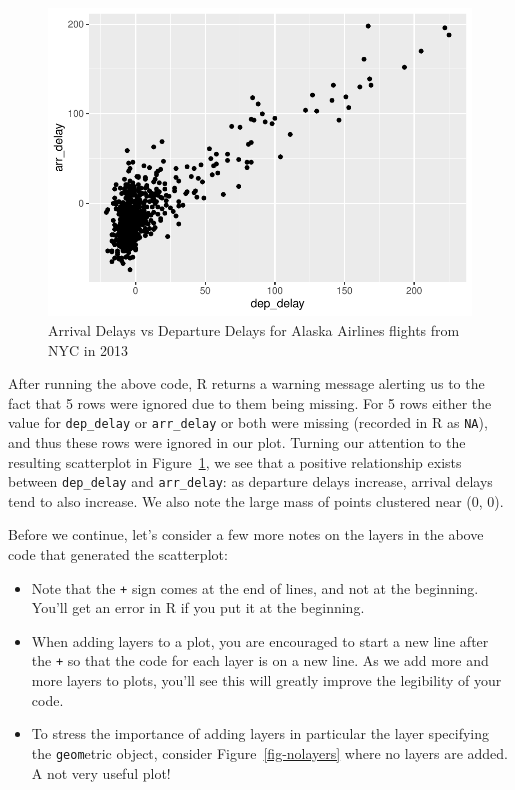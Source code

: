\documentclass[
  letterpaper,
  DIV=11,
  numbers=noendperiod]{scrreprt}
\providecommand{\tightlist}{%
  \setlength{\itemsep}{0pt}\setlength{\parskip}{0pt}}\usepackage{longtable,booktabs,array}
\theoremstyle{definition}
\theoremstyle{remark}
\begin{document}
\begin{figure}

{\centering \includegraphics{02-visualization_files/figure-pdf/fig-noalpha-1.pdf}

}

\caption{\label{fig-noalpha}Arrival Delays vs Departure Delays for
Alaska Airlines flights from NYC in 2013}

\end{figure}

After running the above code, R returns a warning message alerting us to
the fact that 5 rows were ignored due to them being missing. For 5 rows
either the value for \texttt{dep\_delay} or \texttt{arr\_delay} or both
were missing (recorded in R as \texttt{NA}), and thus these rows were
ignored in our plot. Turning our attention to the resulting scatterplot
in Figure~\ref{fig-noalpha}, we see that a positive relationship exists
between \texttt{dep\_delay} and \texttt{arr\_delay}: as departure delays
increase, arrival delays tend to also increase. We also note the large
mass of points clustered near (0, 0).

Before we continue, let's consider a few more notes on the layers in the
above code that generated the scatterplot:

\begin{itemize}
\tightlist
\item
  Note that the \texttt{+} sign comes at the end of lines, and not at
  the beginning. You'll get an error in R if you put it at the
  beginning.
\item
  When adding layers to a plot, you are encouraged to start a new line
  after the \texttt{+} so that the code for each layer is on a new line.
  As we add more and more layers to plots, you'll see this will greatly
  improve the legibility of your code.
\item
  To stress the importance of adding layers in particular the layer
  specifying the \texttt{geom}etric object, consider
  Figure~\ref{fig-nolayers} where no layers are added. A not very useful
  plot!
\end{itemize}
\end{document}
